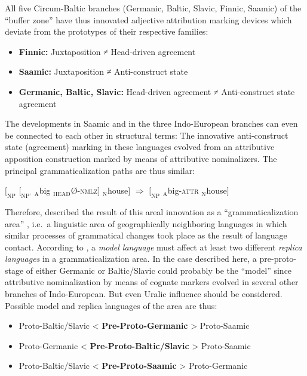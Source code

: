 All five Circum-Baltic branches (Germanic, Baltic, Slavic, Finnic, Saamic) of the “buffer zone” have thus innovated adjective attribution marking devices which deviate from the prototypes of their respective families:
\begin{itemize}
\item	\textbf{Finnic:}
\subitem Juxtaposition ≠ Head\hyp{}driven agreement
\item	\textbf{Saamic:}
\subitem Juxtaposition ≠ Anti-construct state
\item	\textbf{Germanic, Baltic, Slavic:}
\subitem Head\hyp{}driven agreement ≠ Anti-construct state agreement
\end{itemize}
The developments in Saamic and in the three Indo-European branches can even be connected to each other in structural terms: The innovative anti-construct state (agreement) marking in these languages evolved from an attributive apposition construction marked by means of attributive nominalizers. The principal grammaticalization paths are thus similar:
\begin{exe}
\ex $[_{\text{NP}}$ $[_{\text{NP'}}$ $_{\text{A}}$big $_{\text{HEAD}}$Ø-\textsc{nmlz}$]$ $_{\text{N}}$house$]$ $\Rightarrow$ $[_{\text{NP}}$ $_{\text{A}}$big-\textsc{attr} $_{\text{N}}$house$]$
\end{exe}
Therefore, \citet[271]{riesler2006a} described the result of this areal innovation as a “grammaticalization area” \citep{heine-etal2005}, i.e.~a linguistic area of geographically neighboring languages in which similar processes of grammatical changes took place as the result of language contact. According to \citet{heine-etal2005}, a \textit{model language} must affect at least two different \textit{replica languages} in a grammaticalization area. In the case described here, a pre-proto-stage of either Germanic or Baltic\slash{}Slavic could probably be the “model” since attributive nominalization by means of cognate markers evolved in several other branches of Indo-European. But even Uralic influence should be considered. Possible model and replica languages of the area are thus:
\begin{itemize}
\item	\begin{center}Proto\hyp{}Baltic\slash{}Slavic < \textbf{Pre-Proto\hyp{}Germanic} > Proto\hyp{}Saamic\end{center}
\item	\begin{center}Proto\hyp{}Germanic < \textbf{Pre-Proto\hyp{}Baltic\slash{}Slavic} > Proto\hyp{}Saamic\end{center}
\item \begin{center}Proto\hyp{}Baltic\slash{}Slavic < \textbf{Pre-Proto\hyp{}Saamic} > Proto\hyp{}Germanic\end{center}
\end{itemize}
